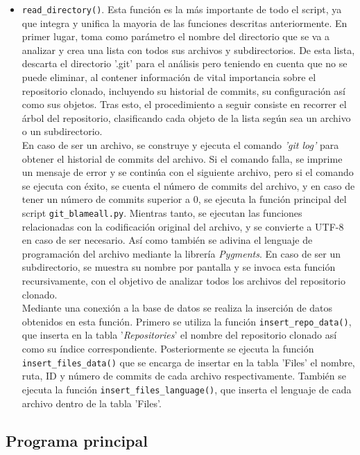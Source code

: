 \documentclass[a4paper, 12pt]{book}
\begin{document}
\begin{itemize}
  \item \texttt{read\_directory()}. Esta función es la más importante de todo el script, ya que integra y unifica la mayoria de las funciones descritas anteriormente. En primer lugar, toma como parámetro el nombre del directorio que se va a analizar y crea una lista con todos sus archivos y subdirectorios.
  De esta lista, descarta el directorio '.git' para el análisis pero teniendo en cuenta que no se puede eliminar, al contener información de vital importancia sobre el repositorio clonado, incluyendo su historial de commits, su configuración así como sus objetos. Tras esto, el procedimiento a seguir consiste
  en recorrer el árbol del repositorio, clasificando cada objeto de la lista según sea un archivo o un subdirectorio. 
  \\En caso de ser un archivo, se construye y ejecuta el comando \textit{'git log'} para obtener el historial de commits del archivo. Si el comando falla, se imprime un mensaje de error y se continúa con el siguiente archivo, pero si el comando se ejecuta con éxito, se cuenta el número de commits del archivo, y 
  en caso de tener un número de commits superior a 0, se ejecuta la función principal del script \texttt{git\_blameall.py}. Mientras tanto, se ejecutan las funciones relacionadas con la codificación original del archivo, y se convierte a UTF-8 en caso de ser necesario. Así como también se adivina el lenguaje de
  programación del archivo mediante la librería \textit{Pygments}. En caso de ser un subdirectorio, se muestra su nombre por pantalla y se invoca esta función recursivamente, con el objetivo de analizar todos los archivos del repositorio clonado.
  \\Mediante una conexión a la base de datos se realiza la inserción de datos obtenidos en esta función. Primero se utiliza la función \texttt{insert\_repo\_data()}, que inserta en la tabla '\textit{Repositories}' el nombre del repositorio clonado así como su índice correspondiente. Posteriormente se ejecuta la función
  \texttt{insert\_files\_data()} que se encarga de insertar en la tabla 'Files' el nombre, ruta, ID y número de commits de cada archivo respectivamente. También se ejecuta la función \texttt{insert\_files\_language()}, que inserta el lenguaje de cada archivo dentro de la tabla 'Files'.
\end{itemize}

\subsection{Programa principal}
\label{subsec:programa-principal}
\end{document}

